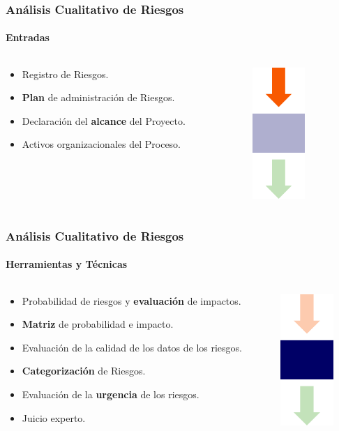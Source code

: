 \frame
{
\frametitle{Análisis Cualitativo de Riesgos}
\framesubtitle{Entradas}
\begin{columns}
	\begin{column}{0.8\textwidth}
		\begin{itemize}
			\item<1-> Registro de Riesgos.
			\item<2-> \textbf{Plan} de administración de Riesgos.
			\item<3-> Declaración del \textbf{alcance} del Proyecto.
			\item<4-> Activos organizacionales del Proceso.
		\end{itemize}
	\end{column}
	\begin{column}{0.2\textwidth}
		\includegraphics[width=2cm]{img/input}
	\end{column}
\end{columns}
}

\frame
{
\frametitle{Análisis Cualitativo de Riesgos}
\framesubtitle{Herramientas y Técnicas}
\begin{columns}
	\begin{column}{0.8\textwidth}
		\begin{itemize}
			\item<1-> Probabilidad de riesgos y \textbf{evaluación} de impactos.
			\item<2-> \textbf{Matriz} de probabilidad e impacto.
			\item<3-> Evaluación de la calidad de los datos de los riesgos.
			\item<4-> \textbf{Categorización} de Riesgos.
			\item<5-> Evaluación de la \textbf{urgencia} de los riesgos.
			\item<6-> Juicio experto.
		\end{itemize}
	\end{column}
	\begin{column}{0.2\textwidth}
		\includegraphics[width=2cm]{img/tools}
	\end{column}
\end{columns}
}

